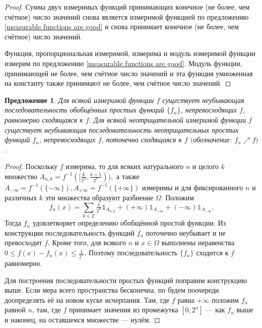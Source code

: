 \documentclass[12pt]{article}
\newtheorem{proposition}[theorem]{Предложение}
\numberwithin{theorem}{section}
\theoremstyle{definition}
\newcommand{\ind}{\mathds{1}}
\begin{document}
	\begin{proof}
		Сумма двух измеримых функций принимающих конечное (не более, чем счётное) число значений снова является
		измеримой функцией по предложению \ref{measurable functions are good} 
		и снова принимает конечное (не более, чем счётное) число значений.
		
		Функция, пропорциональная измеримой, измерима и модуль измеримой функции измерим по предложению 
		\ref{measurable functions are good}. Модуль функции, принимающей не более, чем счётное число значений
		и эта функция умноженная на константу также принимают не более, чем счётное число значений.
	\end{proof}

	\begin{proposition} \label{uniformly converging to measurable function}
		Для всякой измеримой функции $ f $ существует неубывающая последовательность обобщённых простых функций $ \{f_n\} $,
		непревосходящих $ f $, равномерно сходящаяся к $ f $.
		Для всякой неотрицательной измеримой функции $ f $ существует неубывающая последовательность неотрицательных простых функций $ f_n $, непревосходящих $ f $, поточечно сходящаяся к $ f $ $ ( $обозначение: $ f_n \nearrow f $$ ) $.
	\end{proposition}
	
	\begin{proof}
		Поскольку $ f $ измерима, то для всяких натурального $ n $ и целого $ k $
		множество $ A_{n, k} = f^{-1}([\tfrac{k}{2^n}, \tfrac{k + 1}{2^n})), $ а также $
		A_{-\infty} = f^{-1}(\{-\infty\}), A_{+\infty} = f^{-1}(\{+\infty\}) $ измеримы
		и для фиксированного $ n $ и различных $ k $ эти множества образуют разбиение $ \Omega $.
		Положим 
		$$ f_n(x) = \sum\limits_{k \in \mathbb{Z}} \tfrac{k}{2^n}\ind_{A_{n, k}} 
		+ (+\infty)\ind_{A_{+\infty}} + (-\infty)\ind_{A_{-\infty}}. $$
		Тогда $ f_n $ удовлетворяет определению обобщённой простой функции.
		Из конструкции последовательность функций $ f_n $ поточечно неубывает
		и не превосходит $ f $.
		Кроме того, для всякого $ n $ и $ x \in \Omega $ 
		выполнены неравенства $ 0 \leqslant f(x) - f_n(x) \leqslant \tfrac{1}{2^n} $.
		Поэтому последовательность $ \{f_n\} $ сходится к $ f $ равномерно.
		
		Для построения последовательности простых функций поправим конструкцию выше.
		Если мера всего пространства бесконечна, по будем поочереди доопределять её на новом куске исчерпания.
		Там, где $ f $ равна $ +\infty $ положим $ f_n $ равной $ n $,
		там, где $ f $ принимает значения из промежутка $ [0, 2^n] $ --- как $ f_n $ выше
		и наконец, на оставшемся множестве --- нулём.
	\end{proof}
	
\end{document}
